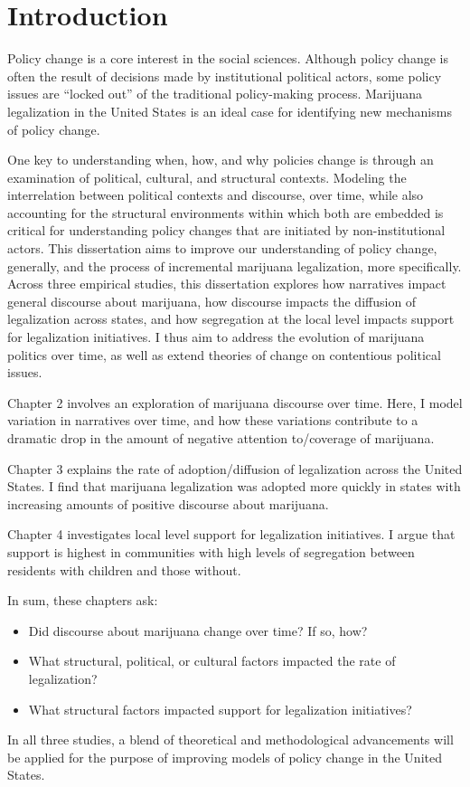 \chapter{Introduction}

Policy change is a core interest in the social sciences. Although policy change is often the result of decisions made by institutional political actors, some policy issues are ``locked out'' of the traditional policy-making process. Marijuana legalization in the United States is an ideal case for identifying new mechanisms of policy change. 

One key to understanding when, how, and why policies change is through an examination of political, cultural, and structural contexts. Modeling the interrelation between political contexts and discourse, over time, while also accounting for the structural environments within which both are embedded is critical for understanding policy changes that are initiated by non-institutional actors. This dissertation aims to improve our understanding of policy change, generally, and the process of incremental marijuana legalization, more specifically. Across three empirical studies, this dissertation explores how narratives impact general discourse about marijuana, how discourse impacts the diffusion of legalization across states, and how segregation at the local level impacts support for legalization initiatives. I thus aim to address the evolution of marijuana politics over time, as well as extend theories of change on contentious political issues. 


Chapter 2 involves an exploration of marijuana discourse over time. Here, I model variation in narratives over time, and how these variations contribute to a dramatic drop in the amount of negative attention to/coverage of marijuana. 

Chapter 3 explains the rate of adoption/diffusion of legalization across the United States. I find that marijuana legalization was adopted more quickly in states with increasing amounts of positive discourse about marijuana. 

Chapter 4 investigates local level support for legalization initiatives. I argue that support is highest in communities with high levels of segregation between residents with children and those without. 


In sum, these chapters ask:

\begin{itemize}
\item Did discourse about marijuana change over time? If so, how?
\item What structural, political, or cultural factors impacted the rate of legalization?
\item What structural factors impacted support for legalization initiatives?
\end{itemize}

In all three studies, a blend of theoretical and methodological advancements will be applied for the purpose of improving models of policy change in the United States.
